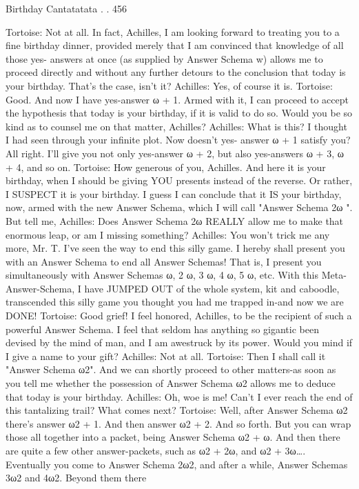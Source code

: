 Birthday Cantatatata . .                                                                   456

Tortoise: Not at all. In fact, Achilles, I am looking forward to treating you to a fine
   birthday dinner, provided merely that I am convinced that knowledge of all those yes-
   answers at once (as supplied by Answer Schema w) allows me to proceed directly and
   without any further detours to the conclusion that today is your birthday. That's the
   case, isn't it?
Achilles: Yes, of course it is.
Tortoise: Good. And now I have yes-answer ω + 1. Armed with it, I can proceed to
   accept the hypothesis that today is your birthday, if it is valid to do so. Would you be
   so kind as to counsel me on that matter, Achilles?
Achilles: What is this? I thought I had seen through your infinite plot. Now doesn't yes-
   answer ω + 1 satisfy you? All right. I'll give you not only yes-answer ω + 2, but also
   yes-answers ω + 3, ω + 4, and so on.
Tortoise: How generous of you, Achilles. And here it is your birthday, when I should be
   giving YOU presents instead of the reverse. Or rather, I SUSPECT it is your birthday.
   I guess I can conclude that it IS your birthday, now, armed with the new Answer
   Schema, which I will call "Answer Schema 2ω ". But tell me, Achilles: Does Answer
   Schema 2ω REALLY allow me to make that enormous leap, or am I missing
   something?
Achilles: You won't trick me any more, Mr. T. I've seen the way to end this silly game. I
   hereby shall present you with an Answer Schema to end all Answer Schemas! That is,
   I present you simultaneously with Answer Schemas ω, 2 ω, 3 ω, 4 ω, 5 ω, etc. With
   this Meta-Answer-Schema, I have JUMPED OUT of the whole system, kit and
   caboodle, transcended this silly game you thought you had me trapped in-and now we
   are DONE!
Tortoise: Good grief! I feel honored, Achilles, to be the recipient of such a powerful
   Answer Schema. I feel that seldom has anything so gigantic been devised by the mind
   of man, and I am awestruck by its power. Would you mind if I give a name to your
   gift?
Achilles: Not at all.
Tortoise: Then I shall call it "Answer Schema ω2". And we can shortly proceed to other
   matters-as soon as you tell me whether the possession of Answer Schema ω2 allows
   me to deduce that today is your birthday.
Achilles: Oh, woe is me! Can't I ever reach the end of this tantalizing trail? What comes
   next?
Tortoise: Well, after Answer Schema ω2 there's answer ω2 + 1. And then answer ω2 + 2.
   And so forth. But you can wrap those all together into a packet, being Answer
   Schema ω2 + ω. And then there are quite a few other answer-packets, such as ω2 + 2ω,
   and ω2 + 3ω…. Eventually you come to Answer Schema 2ω2, and after a while,
   Answer Schemas 3ω2 and 4ω2. Beyond them there




